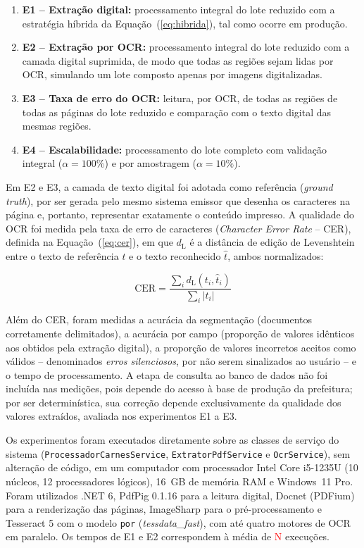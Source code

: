 \documentclass[article,12pt,oneside,a4paper,english,brazil]{abntex2}
\newcommand{\pendente}[1]{\textcolor{red}{#1}}
\newcommand{\NRODADAS}{\pendente{N}}
\begin{document}
\begin{enumerate}
\item \textbf{E1 -- Extração digital:} processamento integral do lote reduzido com a
  estratégia híbrida da Equação~(\ref{eq:hibrida}), tal como ocorre em produção.
\item \textbf{E2 -- Extração por OCR:} processamento integral do lote reduzido com a
  camada digital suprimida, de modo que todas as regiões sejam lidas por OCR, simulando
  um lote composto apenas por imagens digitalizadas.
\item \textbf{E3 -- Taxa de erro do OCR:} leitura, por OCR, de todas as regiões de
  todas as páginas do lote reduzido e comparação com o texto digital das mesmas regiões.
\item \textbf{E4 -- Escalabilidade:} processamento do lote completo com validação
  integral ($\alpha = 100\%$) e por amostragem ($\alpha = 10\%$).
\end{enumerate}

Em E2 e E3, a camada de texto digital foi adotada como referência (\textit{ground
truth}), por ser gerada pelo mesmo sistema emissor que desenha os caracteres na página
e, portanto, representar exatamente o conteúdo impresso. A qualidade do OCR foi medida
pela taxa de erro de caracteres (\textit{Character Error Rate} -- CER), definida na
Equação~(\ref{eq:cer}), em que $d_{\mathrm{L}}$ é a distância de edição de Levenshtein
\cite{levenshtein1966} entre o texto de referência $t$ e o texto reconhecido
$\hat{t}$, ambos normalizados:

\begin{equation}\label{eq:cer}
\mathrm{CER} = \frac{\sum_{i} d_{\mathrm{L}}(t_i, \hat{t}_i)}{\sum_{i} |t_i|}
\end{equation}

Além do CER, foram medidas a acurácia da segmentação (documentos corretamente
delimitados), a acurácia por campo (proporção de valores idênticos aos obtidos pela
extração digital), a proporção de valores incorretos aceitos como válidos --
denominados \emph{erros silenciosos}, por não serem sinalizados ao usuário -- e o tempo
de processamento. A etapa de consulta ao banco de dados não foi incluída nas medições,
pois depende do acesso à base de produção da prefeitura; por ser determinística, sua
correção depende exclusivamente da qualidade dos valores extraídos, avaliada nos
experimentos E1 a E3.

Os experimentos foram executados diretamente sobre as classes de serviço do sistema
(\texttt{ProcessadorCarnesService}, \texttt{ExtratorPdfService} e
\texttt{OcrService}), sem alteração de código, em um computador com processador Intel
Core i5-1235U (10 núcleos, 12 processadores lógicos), 16~GB de memória RAM e Windows~11
Pro. Foram utilizados .NET 6, PdfPig 0.1.16 para a leitura digital, Docnet (PDFium)
para a renderização das páginas, ImageSharp para o pré-processamento e Tesseract 5 com o
modelo \texttt{por} (\textit{tessdata\_fast}), com até quatro motores de OCR em
paralelo. Os tempos de E1 e E2 correspondem à média de \NRODADAS{} execuções.
\end{document}
